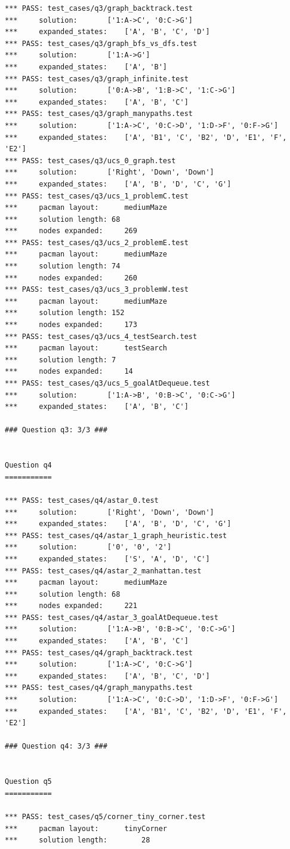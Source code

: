 \documentclass{report}
\begin{document}
\begin{lstlisting}
*** PASS: test_cases/q3/graph_backtrack.test
*** 	solution:		['1:A->C', '0:C->G']
*** 	expanded_states:	['A', 'B', 'C', 'D']
*** PASS: test_cases/q3/graph_bfs_vs_dfs.test
*** 	solution:		['1:A->G']
*** 	expanded_states:	['A', 'B']
*** PASS: test_cases/q3/graph_infinite.test
*** 	solution:		['0:A->B', '1:B->C', '1:C->G']
*** 	expanded_states:	['A', 'B', 'C']
*** PASS: test_cases/q3/graph_manypaths.test
*** 	solution:		['1:A->C', '0:C->D', '1:D->F', '0:F->G']
*** 	expanded_states:	['A', 'B1', 'C', 'B2', 'D', 'E1', 'F', 'E2']
*** PASS: test_cases/q3/ucs_0_graph.test
*** 	solution:		['Right', 'Down', 'Down']
*** 	expanded_states:	['A', 'B', 'D', 'C', 'G']
*** PASS: test_cases/q3/ucs_1_problemC.test
*** 	pacman layout:		mediumMaze
*** 	solution length: 68
*** 	nodes expanded:		269
*** PASS: test_cases/q3/ucs_2_problemE.test
*** 	pacman layout:		mediumMaze
*** 	solution length: 74
*** 	nodes expanded:		260
*** PASS: test_cases/q3/ucs_3_problemW.test
*** 	pacman layout:		mediumMaze
*** 	solution length: 152
*** 	nodes expanded:		173
*** PASS: test_cases/q3/ucs_4_testSearch.test
*** 	pacman layout:		testSearch
*** 	solution length: 7
*** 	nodes expanded:		14
*** PASS: test_cases/q3/ucs_5_goalAtDequeue.test
*** 	solution:		['1:A->B', '0:B->C', '0:C->G']
*** 	expanded_states:	['A', 'B', 'C']

### Question q3: 3/3 ###


Question q4
===========

*** PASS: test_cases/q4/astar_0.test
*** 	solution:		['Right', 'Down', 'Down']
*** 	expanded_states:	['A', 'B', 'D', 'C', 'G']
*** PASS: test_cases/q4/astar_1_graph_heuristic.test
*** 	solution:		['0', '0', '2']
*** 	expanded_states:	['S', 'A', 'D', 'C']
*** PASS: test_cases/q4/astar_2_manhattan.test
*** 	pacman layout:		mediumMaze
*** 	solution length: 68
*** 	nodes expanded:		221
*** PASS: test_cases/q4/astar_3_goalAtDequeue.test
*** 	solution:		['1:A->B', '0:B->C', '0:C->G']
*** 	expanded_states:	['A', 'B', 'C']
*** PASS: test_cases/q4/graph_backtrack.test
*** 	solution:		['1:A->C', '0:C->G']
*** 	expanded_states:	['A', 'B', 'C', 'D']
*** PASS: test_cases/q4/graph_manypaths.test
*** 	solution:		['1:A->C', '0:C->D', '1:D->F', '0:F->G']
*** 	expanded_states:	['A', 'B1', 'C', 'B2', 'D', 'E1', 'F', 'E2']

### Question q4: 3/3 ###


Question q5
===========

*** PASS: test_cases/q5/corner_tiny_corner.test
*** 	pacman layout:		tinyCorner
*** 	solution length:		28


\end{lstlisting}
\end{document}
